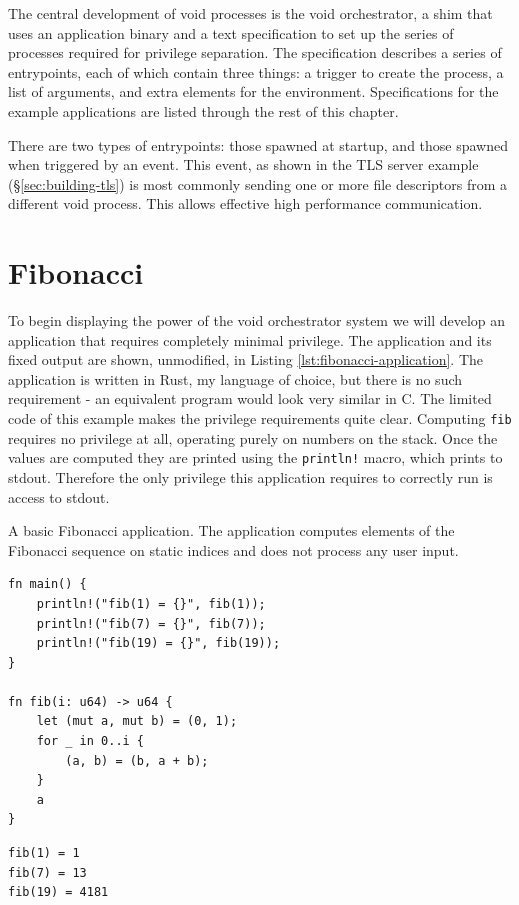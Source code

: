 \documentclass[12pt,a4paper,twoside]{report}
\begin{document}
The central development of void processes is the void orchestrator, a shim that uses an application binary and a text specification to set up the series of processes required for privilege separation. The specification describes a series of entrypoints, each of which contain three things: a trigger to create the process, a list of arguments, and extra elements for the environment. Specifications for the example applications are listed through the rest of this chapter.

There are two types of entrypoints: those spawned at startup, and those spawned when triggered by an event. This event, as shown in the TLS server example (§\ref{sec:building-tls}) is most commonly sending one or more file descriptors from a different void process. This allows effective high performance communication.

\section{Fibonacci}
\label{sec:building-no-permissions}

To begin displaying the power of the void orchestrator system we will develop an application that requires completely minimal privilege. The application and its fixed output are shown, unmodified, in Listing \ref{lst:fibonacci-application}. The application is written in Rust, my language of choice, but there is no such requirement - an equivalent program would look very similar in C. The limited code of this example makes the privilege requirements quite clear. Computing \texttt{fib} requires no privilege at all, operating purely on numbers on the stack. Once the values are computed they are printed using the \texttt{println!} macro, which prints to stdout. Therefore the only privilege this application requires to correctly run is access to stdout.

\begin{listing}
\label{lst:fibonacci-application}
\caption{A basic Fibonacci application. The application computes elements of the Fibonacci sequence on static indices and does not process any user input.}

\begin{verbatim}
fn main() {
    println!("fib(1) = {}", fib(1));
    println!("fib(7) = {}", fib(7));
    println!("fib(19) = {}", fib(19));
}

fn fib(i: u64) -> u64 {
    let (mut a, mut b) = (0, 1);
    for _ in 0..i {
        (a, b) = (b, a + b);
    }
    a
}
\end{verbatim}
\begin{verbatim}
fib(1) = 1
fib(7) = 13
fib(19) = 4181
\end{verbatim}
\end{listing}
\end{document}
